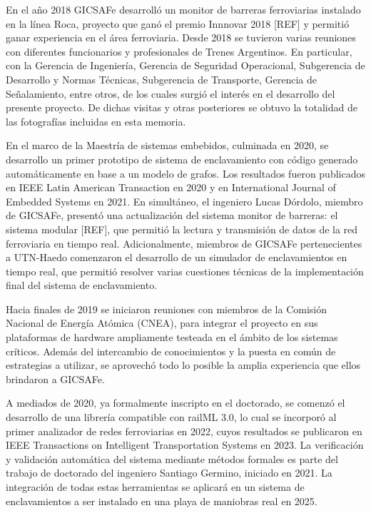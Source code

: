     En el año 2018 GICSAFe desarrolló un monitor de barreras ferroviarias instalado en la línea Roca, proyecto que ganó el premio Innnovar 2018 [REF] y permitió ganar experiencia en el área ferroviaria. Desde 2018 se tuvieron varias reuniones con diferentes funcionarios y profesionales de Trenes Argentinos. En particular, con la Gerencia de Ingeniería, Gerencia de Seguridad Operacional, Subgerencia de Desarrollo y Normas Técnicas, Subgerencia de Transporte, Gerencia de Señalamiento, entre otros, de los cuales surgió el interés en el desarrollo del presente proyecto. De dichas visitas y otras posteriores se obtuvo la totalidad de las fotografías incluidas en esta memoria. 

    En el marco de la Maestría de sistemas embebidos, culminada en 2020, se desarrollo un primer prototipo de sistema de enclavamiento con código generado automáticamente en base a un modelo de grafos. Los resultados fueron publicados en IEEE Latin American Transaction en 2020 y en International Journal of Embedded Systems en 2021. En simultáneo, el ingeniero Lucas Dórdolo, miembro de GICSAFe, presentó una actualización del sistema monitor de barreras: el sistema modular [REF], que permitió la lectura y transmisión de datos de la red ferroviaria en tiempo real. Adicionalmente, miembros de GICSAFe pertenecientes a UTN-Haedo comenzaron el desarrollo de un simulador de enclavamientos en tiempo real, que permitió resolver varias cuestiones técnicas de la implementación final del sistema de enclavamiento.

    Hacia finales de 2019 se iniciaron reuniones con miembros de la Comisión Nacional de Energía Atómica (CNEA), para integrar el proyecto en sus plataformas de hardware ampliamente testeada en el ámbito de los sistemas críticos. Además del intercambio de conocimientos y la puesta en común de estrategias a utilizar, se aprovechó todo lo posible la amplia experiencia que ellos brindaron a GICSAFe.
    
    A mediados de 2020, ya formalmente inscripto en el doctorado, se comenzó el desarrollo de una librería compatible con railML 3.0, lo cual se incorporó al primer analizador de redes ferroviarias en 2022, cuyos resultados se publicaron en IEEE Transactions on Intelligent Transportation Systems en 2023. La verificación y validación automática del sistema mediante métodos formales es parte del trabajo de doctorado del ingeniero Santiago Germino, iniciado en 2021. La integración de todas estas herramientas se aplicará en un sistema de enclavamientos a ser instalado en una playa de maniobras real en 2025. 
